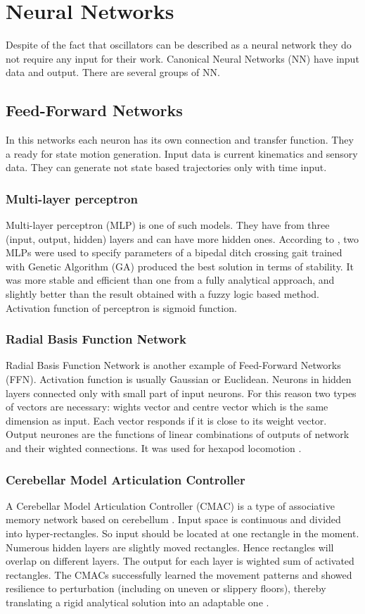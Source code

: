 \documentclass[11pt,a4paper]{report}
\begin{document}
		\section{Neural Networks}
		Despite of the fact that oscillators can be described as a neural network they do not require any input for their work. Canonical Neural Networks (NN) have input data and output. There are several groups of NN.

			\subsection{Feed-Forward Networks}
				In this networks each neuron has its own connection and transfer function. They a ready for state motion generation.  Input data is current kinematics and sensory data. They can generate not state based trajectories only with time input. 
				\subsubsection{Multi-layer perceptron}
					Multi-layer perceptron (MLP) is one of such models. They have from three (input, output, hidden) layers and can have more hidden ones. According to \cite{vundavilli2010dynamically}, two MLPs were used to specify parameters of a bipedal ditch crossing gait trained with Genetic Algorithm (GA) produced the best solution in terms of stability. It was more stable and efficient than one from a fully analytical approach, and slightly better than the result obtained with a fuzzy logic based method. Activation function of perceptron is sigmoid function.
				\subsubsection{Radial Basis Function Network}
					Radial Basis Function Network is another example of Feed-Forward Networks (FFN). Activation function is usually Gaussian or Euclidean. Neurons in hidden layers connected only with small part of input neurons. For this reason two types of vectors are necessary: wights vector and centre vector which is the same dimension as input. Each vector responds if it is close to its weight vector. Output neurones are the functions of linear combinations of outputs of network and their wighted connections.
					It was used for hexapod locomotion \cite{ilg1995learning}.
				\subsubsection{Cerebellar Model Articulation Controller}
					A Cerebellar Model Articulation Controller (CMAC) is a type of associative memory network based on cerebellum \cite{albus1975new}. Input space is continuous and divided into hyper-rectangles. So input should be located at one rectangle in the moment. Numerous hidden layers are slightly moved rectangles. Hence rectangles will overlap on different layers. The output for each layer is wighted sum of activated rectangles. The CMACs successfully learned the movement patterns and showed resilience to perturbation (including on uneven or slippery floors), thereby translating a rigid analytical solution into an adaptable one \cite{sabourin2005robustness}.
\end{document}
